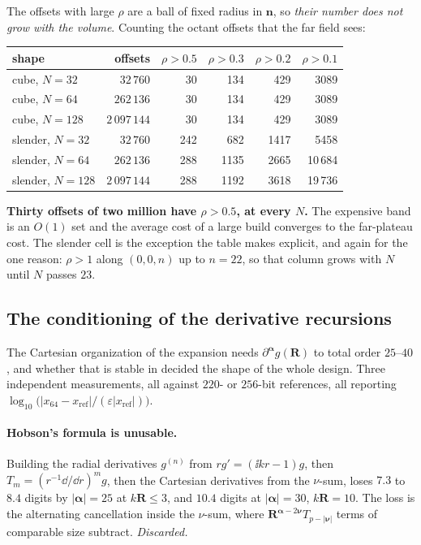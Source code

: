 The offsets with large $\rho$ are a ball of fixed radius in $\mathbf{n}$, so
\emph{their number does not grow with the volume}. Counting the  octant offsets
that the far field sees:

\begin{center}\small
\begin{tabular}{@{}lrrrrr@{}}
\toprule
shape & offsets & $\rho > 0.5$ & $\rho > 0.3$ & $\rho > 0.2$ & $\rho > 0.1$\\
\midrule
cube, $N = 32$  & $32\,760$    & 30 & 134 & 429 & 3089\\
cube, $N = 64$  & $262\,136$   & 30 & 134 & 429 & 3089\\
cube, $N = 128$ & $2\,097\,144$ & 30 & 134 & 429 & 3089\\
slender, $N = 32$  & $32\,760$    & 242 & 682  & 1417 & 5458\\
slender, $N = 64$  & $262\,136$   & 288 & 1135 & 2665 & 10\,684\\
slender, $N = 128$ & $2\,097\,144$ & 288 & 1192 & 3618 & 19\,736\\
\bottomrule
\end{tabular}
\end{center}

\noindent
\textbf{Thirty offsets of two million have $\rho > 0.5$, at every $N$.} The expensive band
is an $O(1)$ set and the average cost of a large build converges to the far-plateau cost.
The slender cell is the exception the table makes explicit, and again for the one reason:
$\rho > 1$ along $(0,0,n)$ up to $n = 22$, so that column grows with $N$ until $N$ passes
$23$.

\subsection{The conditioning of the derivative recursions}
\label{sec:grd:cond}

The Cartesian organization of the expansion needs $\partial^{\boldsymbol\alpha}g(\mathbf{R})$
to total order $25$--$40$, and whether that is stable in  decided the shape of
the whole design. Three independent measurements, all against $220$- or $256$-bit
references, all reporting
$\log_{10}\bigl(|x_{64}-x_{\mathrm{ref}}|/(\varepsilon|x_{\mathrm{ref}}|)\bigr)$.

\paragraph{Hobson's formula is unusable.} Building the radial derivatives $g^{(n)}$ from
$rg' = (\ii kr - 1)g$, then $T_m = (r^{-1}\dd/\dd r)^m g$, then the Cartesian derivatives
from the $\nu$-sum, loses $7.3$ to $8.4$ digits by $|\boldsymbol\alpha| = 25$ at
$k\mathbf{R} \le 3$, and $10.4$ digits at $|\boldsymbol\alpha| = 30$,
$k\mathbf{R} = 10$. The loss is the alternating cancellation inside the $\nu$-sum, where
$\mathbf{R}^{\boldsymbol\alpha-2\boldsymbol\nu}T_{p-|\boldsymbol\nu|}$ terms of comparable
size subtract. \emph{Discarded.}

